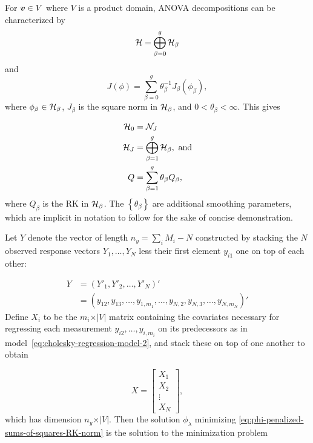 \bigskip

For $\mbox{\boldmath $v$} \in V$ where $V$ is a product domain, ANOVA decompositions can be characterized by 
\begin{equation}\label{eq:ssanova-decomposition-of-RKHS}
\mathcal{H} = \bigoplus\limits_{\beta=0}^{g} \mathcal{H}_\beta
\end{equation}
\noindent
and
\begin{equation}\label{eq:ssanova-decomposition-of-penalty}
J\left(\phi\right) = \sum_{\beta=0}^{g} \theta^{-1}_\beta J_\beta \left( \phi_\beta \right),
\end{equation}
\noindent
where $\phi_\beta \in \mathcal{H}_\beta$, $J_\beta$ is the square norm in $\mathcal{H}_\beta$, and $0 < \theta_\beta < \infty$. This gives 

\begin{align*}
\mathcal{H}_0 &= \mathcal{N}_J \\
\mathcal{H}_J &= \bigoplus\limits_{\beta=1}^{g} \mathcal{H}_\beta, \mbox{ and} \\
Q &= \sum_{\beta=1}^g \theta_\beta Q_\beta,
\end{align*}
\noindent
where $Q_\beta$ is the RK in $\mathcal{H}_\beta$. The $\left \{ \theta_\beta \right\}$ are additional smoothing parameters, which are implicit in notation to follow for the sake of concise demonstration. 


\bigskip
\noindent
Let $Y$ denote the vector of length $n_y= \sum_{i} M_i - N$  constructed by stacking the $N$ observed response vectors $Y_1,\dots, Y_N$ less their first element $y_{i1}$ one on top of each other:

\begin{align*}
Y &= \left( Y'_1, Y'_2, \dots, Y'_{N} \right)'\\
 &= \left( y_{12}, y_{13},\dots, y_{1,m_1}, \dots, y_{N,2}, y_{N,3},\dots, y_{N,m_N} \right)'
\end{align*}
\noindent
Define $X_i$ to be the $m_i \times \vert V \vert$ matrix containing the covariates necessary for regressing each measurement $y_{i2}, \dots, y_{i,m_i}$ on its predecessors as in model~\ref{eq:cholesky-regression-model-2}, and stack these on top of one another to obtain

\begin{equation} \label{eq:ar-design-matrix-1}
X = \begin{bmatrix}
X_1 \\
X_2\\
\vdots \\
X_N
\end{bmatrix},
\end{equation}
\noindent
which has dimension $n_y \times \vert V \vert$. Then the solution $\phi_\lambda$ minimizing \ref{eq:phi-penalized-sums-of-squares-RK-norm}  is the solution to the minimization problem

